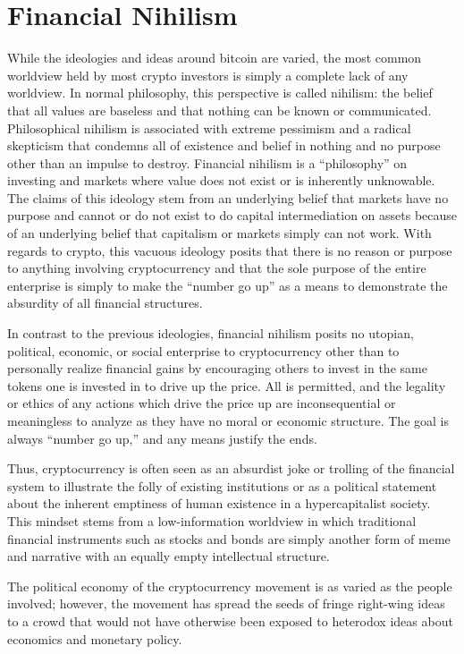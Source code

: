 \section{Financial Nihilism}

While the ideologies and ideas around bitcoin are varied, the most common
worldview held by most crypto investors is simply a complete lack of any
worldview. In normal philosophy, this perspective is called nihilism: the belief
that all values are baseless and that nothing can be known or communicated.
Philosophical nihilism is associated with extreme pessimism and a radical
skepticism that condemns all of existence and belief in nothing and no purpose
other than an impulse to destroy. Financial nihilism is a ``philosophy'' on
investing and markets where value does not exist or is inherently unknowable.
The claims of this ideology stem from an underlying belief that markets have no
purpose and cannot or do not exist to do capital intermediation on assets
because of an underlying belief that capitalism or markets simply can not work.
With regards to crypto, this vacuous ideology posits that there is no reason or
purpose to anything involving cryptocurrency and that the sole purpose of the
entire enterprise is simply to make the ``number go up'' as a means to demonstrate
the absurdity of all financial structures.


In contrast to the previous ideologies, financial nihilism posits no utopian,
political, economic, or social enterprise to cryptocurrency other than to
personally realize financial gains by encouraging others to invest in the same
tokens one is invested in to drive up the price. All is permitted, and the
legality or ethics of any actions which drive the price up are inconsequential
or meaningless to analyze as they have no moral or economic structure. The goal
is always ``number go up,'' and any means justify the ends.

Thus, cryptocurrency is often seen as an absurdist joke or trolling of the
financial system to illustrate the folly of existing institutions or as a
political statement about the inherent emptiness of human existence in a
hypercapitalist society. This mindset stems from a low-information worldview in
which traditional financial instruments such as stocks and bonds are simply
another form of meme and narrative with an equally empty intellectual structure.


The political economy of the cryptocurrency movement is as varied as the people
involved; however, the movement has spread the seeds of fringe right-wing ideas
to a crowd that would not have otherwise been exposed to heterodox ideas about
economics and monetary policy.
